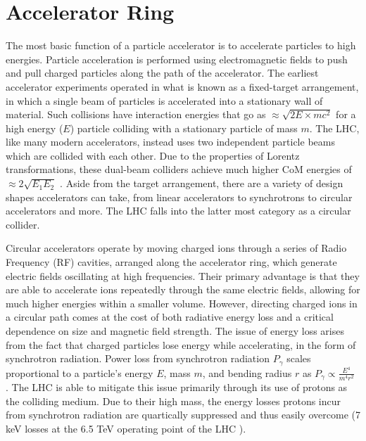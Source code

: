 \section{Accelerator Ring}

    The most basic function of a particle accelerator is to accelerate particles to high energies.
    Particle acceleration is performed using electromagnetic fields to push and pull charged particles along the path of the accelerator.
    The earliest accelerator experiments operated in what is known as a fixed-target arrangement,
        in which a single beam of particles is accelerated into a stationary wall of material.
    Such collisions have interaction energies that go as $\approx \sqrt{2 E \times m c^2}$ for a high energy ($E$) particle colliding with a stationary particle of mass $m$.
    The LHC, like many modern accelerators, instead uses two independent particle beams which are collided with each other.
    Due to the properties of Lorentz transformations, these dual-beam colliders achieve much higher CoM energies of $\approx 2 \sqrt{E_1 E_2}$ \cite{modern_and_future_colliders}.
    Aside from the target arrangement, there are a variety of design shapes accelerators can take, from linear accelerators to synchrotrons to circular accelerators and more.
    The LHC falls into the latter most category as a circular collider.

    Circular accelerators operate by moving charged ions through a series of Radio Frequency (RF) cavities,
        arranged along the accelerator ring,
        which generate electric fields oscillating at high frequencies.
    Their primary advantage is that they are able to accelerate ions repeatedly through the same electric fields, allowing for much higher energies within a smaller volume.
    However, directing charged ions in a circular path comes at the cost of both radiative energy loss and a critical dependence on size and magnetic field strength.
    The issue of energy loss arises from the fact that charged particles lose energy while accelerating, in the form of synchrotron radiation.
    Power loss from synchrotron radiation $P_\gamma$ scales proportional to a particle's energy $E$, mass $m$,
        and bending radius $r$ as $P_\gamma \propto \frac{E^4}{m^4 r^2}$ \cite{2007_Book_ParticleAcceleratorPhysics}.
    The LHC is able to mitigate this issue primarily through its use of protons as the colliding medium.
    Due to their high mass, the energy losses protons incur from synchrotron radiation are quartically suppressed
        and thus easily overcome (7 keV losses at the 6.5 TeV operating point of the LHC \cite{lhc_machine}). %

